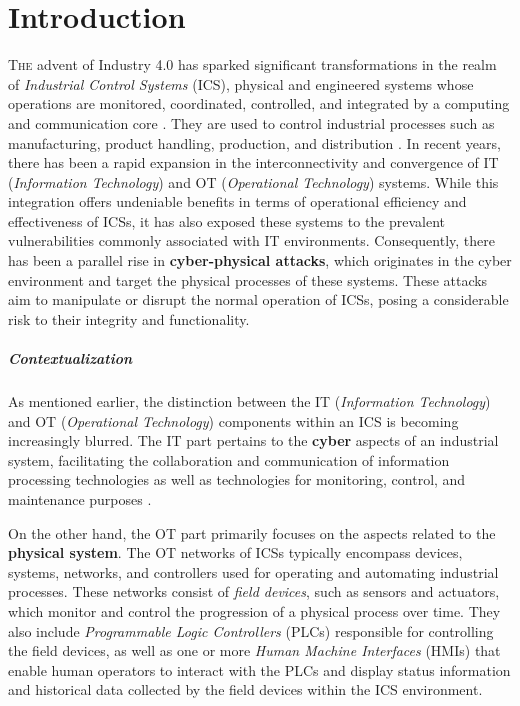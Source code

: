 \chapter{Introduction}
\label{intro}

\lettrine[lines=2]{T}{he} advent of Industry 4.0 has sparked significant transformations in the realm of \textit{Industrial Control Systems} (ICS), physical and engineered systems whose operations are monitored, coordinated, controlled, and integrated by a computing and communication core \cite{ics_definition_giusta}. They are used to control industrial processes such as manufacturing, product handling, production, and distribution \cite{ics_definition}. In recent years, there has been a rapid expansion in the interconnectivity and convergence of IT (\textit{Information Technology}) and OT (\textit{Operational Technology}) systems. While this integration offers undeniable benefits in terms of operational efficiency and effectiveness of ICSs, it has also exposed these systems to the prevalent vulnerabilities commonly associated with IT environments. Consequently, there has been a parallel rise in \textbf{cyber-physical attacks}, which originates in the cyber environment and target the physical processes of these systems. These attacks aim to manipulate or disrupt the normal operation of ICSs, posing a considerable risk to their integrity and functionality.

\paragraph{Contextualization}
\label{par:1_context}
As mentioned earlier, the distinction between the IT (\textit{Information Technology}) and OT (\textit{Operational Technology}) components within an ICS is becoming increasingly blurred. The IT part pertains to the \textbf{cyber} aspects of an industrial system, facilitating the collaboration and communication of information processing technologies as well as technologies for monitoring, control, and maintenance purposes \cite{tesi_phd_norvegese}.

On the other hand, the OT part primarily focuses on the aspects related to the \textbf{physical system}. The OT networks of ICSs typically encompass devices, systems, networks, and controllers used for operating and automating industrial processes. These networks consist of \textit{field devices}, such as sensors and actuators, which monitor and control the progression of a physical process over time. They also include \textit{Programmable Logic Controllers} (PLCs) responsible for controlling the field devices, as well as one or more \textit{Human Machine Interfaces} (HMIs) that enable human operators to interact with the PLCs and display status information and historical data collected by the field devices within the ICS environment.

